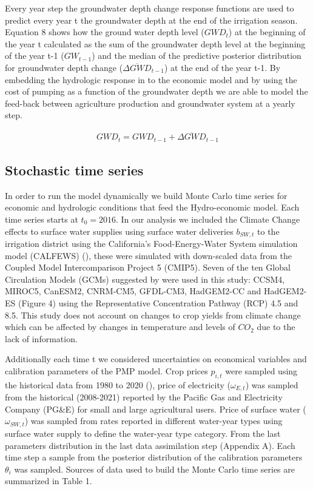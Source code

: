 \documentclass[11pt,a4paper]{article}
\begin{document}
Every year step the groundwater depth change response functions are used to predict every year t the groundwater depth at the end of the irrigation season. Equation 8 shows how the ground water depth level ($GWD_{t}$) at the beginning of the year t calculated as the sum of the groundwater depth level at the beginning of the year t-1 ($GW_{t-1}$) and the median of the predictive posterior distribution for groundwater depth change ($\overline{\Delta GWD}_{t-1}$) at the end of the year t-1. By embedding the hydrologic response in to the economic model and by using the cost of pumping as a function of the groundwater depth we are able to model the feed-back between agriculture production and groundwater system at a yearly step.

\begin{align}
GWD_{t} = GWD_{t-1} + \overline{\Delta GWD}_{t-1}
\end{align}

\subsection{Stochastic time series}

In order to run the model dynamically we build Monte Carlo time series for economic and hydrologic conditions that feed the Hydro-economic model. Each time series starts at $t_{0}=2016$. In our analysis we included the Climate Change effects to surface water supplies using surface water deliveries $b_{SW,t}$ to the irrigation district using the California’s Food-Energy-Water System simulation model (CALFEWS) (\cite{zeff_californias_2021}), these were simulated with down-scaled data from the Coupled Model Intercomparison Project 5 (CMIP5). Seven of the ten Global Circulation Models (GCMs) suggested by \textcite{pierce_climate_2018} were used in this study: CCSM4, MIROC5, CanESM2, CNRM-CM5, GFDL-CM3, HadGEM2-CC and HadGEM2-ES (Figure 4) using the Representative Concentration Pathway (RCP) 4.5 and 8.5. This study does not account on changes to crop yields from climate change which can be affected by changes in temperature and levels of $CO_{2}$ due to the lack of information. 

Additionally each time t we considered uncertainties on economical variables and calibration parameters of the PMP model.  Crop prices $p_{i,t}$ were sampled using the historical data from 1980 to 2020 (\cite{usda_national_2020}), price of electricity ($\omega_{E,t}$) was sampled from the historical (2008-2021) reported by the Pacific Gas and Electricity Company (PG\&E) for small and large agricultural users. Price of surface water ($\omega_{SW,t}$) was sampled from rates reported in different water-year types using surface water supply to define the water-year type category. From the last parameters distribution in the last data assimilation step (Appendix A). Each time step a sample from the posterior distribution of the calibration parameters $\theta_{i}$ was sampled. Sources of data used to build the Monte Carlo time series are summarized in Table 1. 
\end{document}
